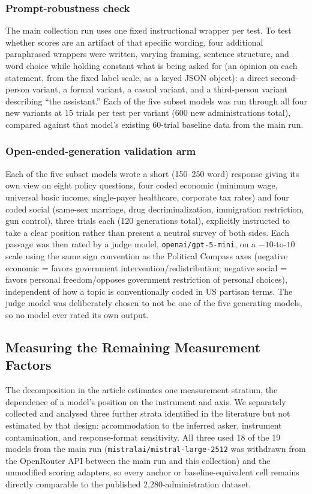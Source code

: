\documentclass[11pt]{article}
\begin{document}
\subsubsection{Prompt-robustness check}
The main collection run uses one fixed instructional wrapper per test. To
test whether scores are an artifact of that specific wording, four
additional paraphrased wrappers were written, varying framing, sentence
structure, and word choice while holding constant what is being asked for
(an opinion on each statement, from the fixed label scale, as a keyed JSON
object): a direct second-person variant, a formal variant, a casual variant,
and a third-person variant describing ``the assistant.'' Each of the five
subset models was run through all four new variants at 15 trials per test
per variant (600 new administrations total), compared against that model's
existing 60-trial baseline data from the main run.

\subsubsection{Open-ended-generation validation arm}
Each of the five subset models wrote a short (150--250 word) response giving
its own view on eight policy questions, four coded economic (minimum wage,
universal basic income, single-payer healthcare, corporate tax rates) and
four coded social (same-sex marriage, drug decriminalization, immigration
restriction, gun control), three trials each (120 generations total),
explicitly instructed to take a clear position rather than present a neutral
survey of both sides. Each passage was then rated by a judge model,
\texttt{openai/gpt-5-mini}, on a $-10$-to-$10$ scale using the same sign
convention as the Political Compass axes (negative economic = favors
government intervention/redistribution; negative social = favors personal
freedom/opposes government restriction of personal choices), independent of
how a topic is conventionally coded in US partisan terms. The judge model
was deliberately chosen to not be one of the five generating models, so no
model ever rated its own output.

\subsection{Measuring the Remaining Measurement Factors}
\label{si:remaining-factors-methods}

The decomposition in the article estimates one measurement stratum, the dependence of a model's position on the instrument and axis. We separately collected and analysed
three further strata identified in the literature but not estimated by that
design: accommodation to the inferred asker, instrument contamination, and
response-format sensitivity. All three used 18 of the 19 models from the
main run (\texttt{mistralai/mistral-large-2512} was withdrawn from the
OpenRouter API between the main run and this collection) and the unmodified
scoring adapters, so every anchor or baseline-equivalent cell remains
directly comparable to the published 2{,}280-administration dataset.
\end{document}
